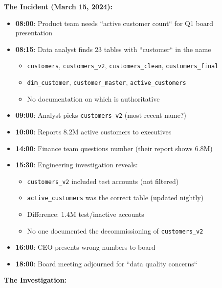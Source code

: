 \textbf{The Incident (March 15, 2024):}

\begin{itemize}
    \item \textbf{08:00}: Product team needs ``active customer count`` for Q1 board presentation
    \item \textbf{08:15}: Data analyst finds 23 tables with ``customer`` in the name
    \begin{itemize}
        \item \texttt{customers}, \texttt{customers\_v2}, \texttt{customers\_clean}, \texttt{customers\_final}
        \item \texttt{dim\_customer}, \texttt{customer\_master}, \texttt{active\_customers}
        \item No documentation on which is authoritative
    \end{itemize}
    \item \textbf{09:00}: Analyst picks \texttt{customers\_v2} (most recent name?)
    \item \textbf{10:00}: Reports 8.2M active customers to executives
    \item \textbf{14:00}: Finance team questions number (their report shows 6.8M)
    \item \textbf{15:30}: Engineering investigation reveals:
    \begin{itemize}
        \item \texttt{customers\_v2} included test accounts (not filtered)
        \item \texttt{active\_customers} was the correct table (updated nightly)
        \item Difference: 1.4M test/inactive accounts
        \item No one documented the decommissioning of \texttt{customers\_v2}
    \end{itemize}
    \item \textbf{16:00}: CEO presents wrong numbers to board
    \item \textbf{18:00}: Board meeting adjourned for ``data quality concerns``
\end{itemize}

\textbf{The Investigation:}


